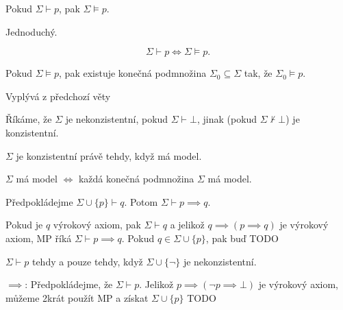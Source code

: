 \documentclass[12pt]{article}                   %
\begin{document}
    \begin{tvrzeni}
        Pokud $\Sigma \vdash p$, pak $\Sigma \models p$.

        \begin{dukazin}
            Jednoduchý.
        \end{dukazin}
    \end{tvrzeni}

    \begin{veta}
        $$ \Sigma \vdash p \Leftrightarrow \Sigma \models p. $$ 
    \end{veta}

    \begin{veta}
        Pokud $\Sigma \models p$, pak existuje konečná podmnožina $\Sigma_0 \subseteq \Sigma$ tak, že $\Sigma_0 \models p$.

        \begin{dukazin}
            Vyplývá z předchozí věty
        \end{dukazin}
    \end{veta}

    \begin{definice}[Konzistentnost]
        Říkáme, že $\Sigma$ je nekonzistentní, pokud $\Sigma \vdash \bot$, jinak (pokud $\Sigma \not\vdash \bot$) je konzistentní.
    \end{definice}

    \begin{veta}
        $\Sigma$ je konzistentní právě tehdy, když má model.
    \end{veta}

    \begin{dusledek}
        $\Sigma$ má model $\Leftrightarrow$ každá konečná podmnožina $\Sigma$ má model.
    \end{dusledek}

    \begin{lemma}[Dedukce]
        Předpokládejme $\Sigma \cup \{p\} \vdash q$. Potom $\Sigma \vdash p \implies q$.

        \begin{dukazin}[Indukcí]
            Pokud je $q$ výrokový axiom, pak $\Sigma \vdash q$ a jelikož $q \implies (p \implies q)$ je výrokový axiom, MP říká $\Sigma \vdash p \implies q$. Pokud $q \in \Sigma \cup \{p\}$, pak buď TODO
        \end{dukazin}
    \end{lemma}

    \begin{dusledek}
        $\Sigma \vdash p$ tehdy a pouze tehdy, když $\Sigma \cup \{\neg\}$ je nekonzistentní.

        \begin{dukazin}
            $\implies$: Předpokládejme, že $\Sigma \vdash p$. Jelikož $p \implies (\neg p \implies \bot)$ je výrokový axiom, můžeme 2krát použít MP a získat $\Sigma \cup \{p\}$ TODO
        \end{dukazin}
    \end{dusledek}
\end{document}
